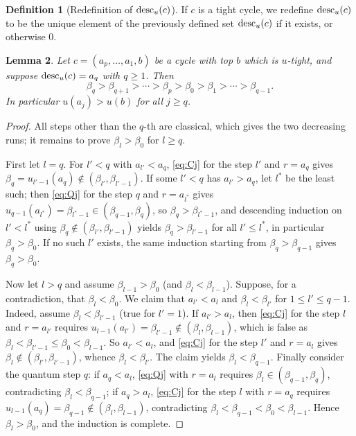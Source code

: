 \documentclass{amsart}
\newtheorem{lemma}{Lemma}[section]
\theoremstyle{definition}
\newtheorem{definition}[lemma]{Definition}
\theoremstyle{remark}
\numberwithin{equation}{section}
\begin{document}
\begin{definition}[Redefinition of $\mathrm{desc}_u(c)$]
If $c$ is a tight cycle, we redefine $\mathrm{desc}_u(c)$ to be the unique element of the previously defined set $\mathrm{desc}_u(c)$ if it exists, or otherwise $0$.
\end{definition}

\begin{lemma} \label{lemma:geq}
Let $c=(a_p,\ldots,a_1,b)$ be a cycle with top $b$ which is $u$-tight, and suppose $\mathrm{desc}_u(c)=a_q$ with $q\geq1$. Then
$$\beta_q>\beta_{q+1}>\cdots>\beta_p>\beta_0>\beta_1>\cdots>\beta_{q-1}.$$
In particular $u(a_j)>u(b)$ for all $j\geq q$.
\end{lemma}
\begin{proof}
All steps other than the $q$-th are classical, which gives the two decreasing runs; it remains to prove $\beta_l>\beta_0$ for $l\geq q$.

First let $l=q$. For $l'<q$ with $a_{l'}<a_q$, \eqref{eq:Cj} for the step $l'$ and $r=a_q$ gives $\beta_q=u_{l'-1}(a_q)\notin(\beta_{l'},\beta_{l'-1})$. If some $l'<q$ has $a_{l'}>a_q$, let $l^\ast$ be the least such; then \eqref{eq:Qj} for the step $q$ and $r=a_{l^\ast}$ gives $u_{q-1}(a_{l^\ast})=\beta_{l^\ast-1}\in(\beta_{q-1},\beta_q)$, so $\beta_q>\beta_{l^\ast-1}$, and descending induction on $l'<l^\ast$ using $\beta_q\notin(\beta_{l'},\beta_{l'-1})$ yields $\beta_q>\beta_{l'-1}$ for all $l'\leq l^\ast$, in particular $\beta_q>\beta_0$. If no such $l'$ exists, the same induction starting from $\beta_q>\beta_{q-1}$ gives $\beta_q>\beta_0$.

Now let $l>q$ and assume $\beta_{l-1}>\beta_0$ (and $\beta_l<\beta_{l-1}$). Suppose, for a contradiction, that $\beta_l<\beta_0$. We claim that $a_{l'}<a_l$ and $\beta_l<\beta_{l'}$ for $1\leq l'\leq q-1$. Indeed, assume $\beta_l<\beta_{l'-1}$ (true for $l'=1$). If $a_{l'}>a_l$, then \eqref{eq:Cj} for the step $l$ and $r=a_{l'}$ requires $u_{l-1}(a_{l'})=\beta_{l'-1}\notin(\beta_l,\beta_{l-1})$, which is false as $\beta_l<\beta_{l'-1}\leq\beta_0<\beta_{l-1}$. So $a_{l'}<a_l$, and \eqref{eq:Cj} for the step $l'$ and $r=a_l$ gives $\beta_l\notin(\beta_{l'},\beta_{l'-1})$, whence $\beta_l<\beta_{l'}$. The claim yields $\beta_l<\beta_{q-1}$. Finally consider the quantum step $q$: if $a_q<a_l$, \eqref{eq:Qj} with $r=a_l$ requires $\beta_l\in(\beta_{q-1},\beta_q)$, contradicting $\beta_l<\beta_{q-1}$; if $a_q>a_l$, \eqref{eq:Cj} for the step $l$ with $r=a_q$ requires $u_{l-1}(a_q)=\beta_{q-1}\notin(\beta_l,\beta_{l-1})$, contradicting $\beta_l<\beta_{q-1}<\beta_0<\beta_{l-1}$. Hence $\beta_l>\beta_0$, and the induction is complete.
\end{proof}
\end{document}
